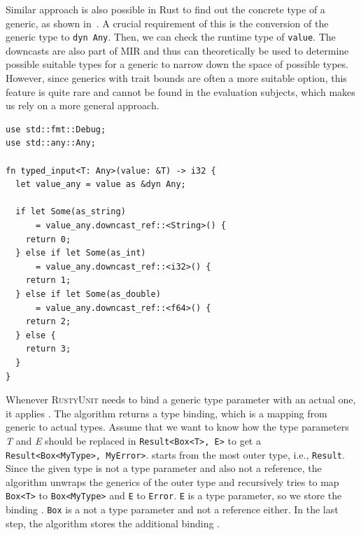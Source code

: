 \documentclass[paper=a4,%
  twoside,%
  BCOR4mm,%
  abstract=true,%
  toc=bibliography,%
  chapterprefix=true,%
  toc=bibliographynumbered,%
  open=right,%
  english,%
  pagesize=pdftex]{scrreprt}
\newcommand{\tech}{\textsc{RustyUnit}\xspace}
\newcommand{\mir}{\ac{MIR}\xspace}
\begin{document}
Similar approach is also possible in Rust to find out the concrete type of a generic, as shown in~. A crucial requirement of this is the conversion of the generic type to \texttt{dyn Any}. Then, we can check the runtime type of \texttt{value}. The downcasts are also part of \mir and thus can theoretically be used to determine possible suitable types for a generic to narrow down the space of possible types. However, since generics with trait bounds are often a more suitable option, this feature is quite rare and cannot be found in the evaluation subjects, which makes us rely on a more general approach. 

\begin{lstlisting}[style=boxed, caption={The execution path of the generic Rust function depends on the concrete type of the argument}, label=lst:rust-runtime-reflection]
use std::fmt::Debug;
use std::any::Any;

fn typed_input<T: Any>(value: &T) -> i32 {
  let value_any = value as &dyn Any;

  if let Some(as_string)
      = value_any.downcast_ref::<String>() {
    return 0;
  } else if let Some(as_int)
      = value_any.downcast_ref::<i32>() {
    return 1;
  } else if let Some(as_double)
      = value_any.downcast_ref::<f64>() {
    return 2;
  } else {
    return 3;
  }
}
\end{lstlisting}

Whenever \tech needs to bind a generic type parameter with an actual one, it applies . The algorithm returns a type binding, which is a mapping from generic to actual types. Assume that we want to know how the type parameters \emph{T} and \emph{E} should be replaced in \texttt{Result<Box<T>, E>} to get a \texttt{Result<Box<MyType>, MyError>}.  starts from the most outer type, i.e., \texttt{Result}. Since the given type is not a type parameter and also not a reference, the algorithm unwraps the generics of the outer type and recursively tries to map \texttt{Box<T>} to \texttt{Box<MyType>} and \texttt{E} to \texttt{Error}. \texttt{E} is a type parameter, so we store the binding \texttt{}. \texttt{Box} is a not a type parameter and not a reference either. In the last step, the algorithm stores the additional binding \texttt{}.
\end{document}
